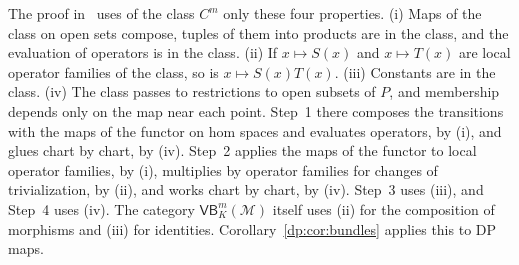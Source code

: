 The proof in~\cite{I} uses of the class $C^m$ only these four properties. (i) Maps of the class on open sets compose, tuples of them into products are in the class, and the evaluation of operators is in the class. (ii) If $x\mapsto S(x)$ and $x\mapsto T(x)$ are local operator families of the class, so is $x\mapsto S(x)T(x)$. (iii) Constants are in the class. (iv) The class passes to restrictions to open subsets of $P$, and membership depends only on the map near each point. Step~1 there composes the transitions with the maps of the functor on hom spaces and evaluates operators, by (i), and glues chart by chart, by (iv). Step~2 applies the maps of the functor to local operator families, by (i), multiplies by operator families for changes of trivialization, by (ii), and works chart by chart, by (iv). Step~3 uses (iii), and Step~4 uses (iv). The category $\mathsf{VB}^m_K(\mathcal M)$ itself uses (ii) for the composition of morphisms and (iii) for identities. Corollary~\ref{dp:cor:bundles} applies this to DP maps.
